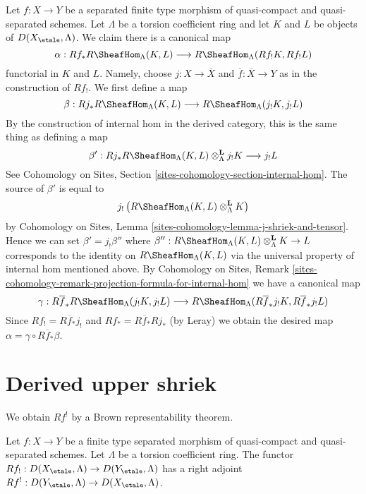 \begin{remark}
\label{remark-projection-formula-for-internal-hom}
Let $f : X \to Y$ be a separated finite type morphism of quasi-compact
and quasi-separated schemes. Let $\Lambda$ be a torsion coefficient ring
and let $K$ and $L$ be objects of $D(X_\etale, \Lambda)$. We claim
there is a canonical map
$$
\alpha :
Rf_*R\SheafHom_\Lambda(K, L)
\longrightarrow
R\SheafHom_\Lambda(Rf_!K, Rf_!L)
$$
functorial in $K$ and $L$. Namely, choose $j : X \to \overline{X}$ and
$\overline{f} : \overline{X} \to Y$ as in the construction of $Rf_!$.
We first define a map
$$
\beta :
Rj_*R\SheafHom_\Lambda(K, L)
\longrightarrow
R\SheafHom_\Lambda(j_!K, j_!L)
$$
By the construction of internal hom in the derived category, this is
the same thing as defining a map
$$
\beta' :
Rj_*R\SheafHom_\Lambda(K, L) \otimes_\Lambda^\mathbf{L} j_!K
\longrightarrow
j_!L
$$
See Cohomology on Sites, Section \ref{sites-cohomology-section-internal-hom}.
The source of $\beta'$ is equal to
$$
j_!\left(R\SheafHom_\Lambda(K, L) \otimes_\Lambda^\mathbf{L} K\right)
$$
by Cohomology on Sites, Lemma \ref{sites-cohomology-lemma-j-shriek-and-tensor}.
Hence we can set $\beta' = j_!\beta''$ where
$\beta'' : R\SheafHom_\Lambda(K, L) \otimes_\Lambda^\mathbf{L} K \to L$
corresponds to the identity on $R\SheafHom_\Lambda(K, L)$
via the universal property of internal hom mentioned above. By
Cohomology on Sites, Remark
\ref{sites-cohomology-remark-projection-formula-for-internal-hom}
we have a canonical map
$$
\gamma :
R\overline{f}_*R\SheafHom_\Lambda(j_!K, j_!L)
\longrightarrow
R\SheafHom_\Lambda(R\overline{f}_*j_!K, R\overline{f}_*j_!L)
$$
Since $Rf_! = R\overline{f}_*j_!$ and $Rf_* = R\overline{f}_* Rj_*$
(by Leray) we obtain the desired map
$\alpha = \gamma \circ R\overline{f}_*\beta$.
\end{remark}









\section{Derived upper shriek}
\label{section-derived-upper-shriek}

\noindent
We obtain $Rf^!$ by a Brown representability theorem.

\begin{lemma}
\label{lemma-upper-shriek-derived}
Let $f : X \to Y$ be a finite type separated morphism of quasi-compact
and quasi-separated schemes. Let $\Lambda$ be a torsion coefficient ring.
The functor
$Rf_! : D(X_\etale, \Lambda) \to D(Y_\etale, \Lambda)$
has a right adjoint
$Rf^! : D(Y_\etale, \Lambda) \to D(X_\etale, \Lambda)$.
\end{lemma}

